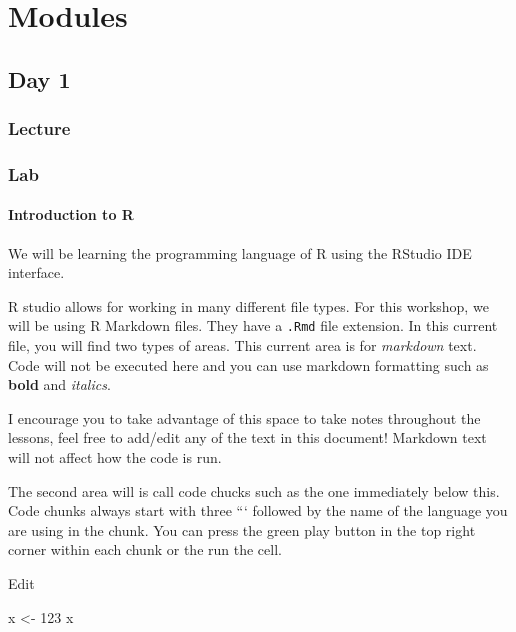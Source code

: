 \documentclass[
]{book}
\newenvironment{Shaded}{\begin{snugshade}}{\end{snugshade}}
\newcommand{\DecValTok}[1]{\textcolor[rgb]{0.00,0.00,0.81}{#1}}
\newcommand{\NormalTok}[1]{#1}
\newcommand{\OtherTok}[1]{\textcolor[rgb]{0.56,0.35,0.01}{#1}}
\begin{document}
\part{Modules}\label{part-modules}

\chapter{Day 1}\label{day-1}

\section{Lecture}\label{lecture}

\section{Lab}\label{lab}

\subsection{Introduction to R}\label{introduction-to-r}

We will be learning the programming language of R using the RStudio IDE interface.

R studio allows for working in many different file types. For this workshop, we will be using R Markdown files. They have a \texttt{.Rmd} file extension. In this current file, you will find two types of areas. This current area is for \emph{markdown} text. Code will not be executed here and you can use markdown formatting such as \textbf{bold} and \emph{italics}.

I encourage you to take advantage of this space to take notes throughout the lessons, feel free to add/edit any of the text in this document! Markdown text will not affect how the code is run.

The second area will is call code chucks such as the one immediately below this. Code chunks always start with three ``` followed by the name of the language you are using in the chunk. You can press the green play button in the top right corner within each chunk or the run the cell.

Edit

\begin{Shaded}
\begin{Highlighting}[]
\NormalTok{x }\OtherTok{\textless{}{-}} \DecValTok{123}
\NormalTok{x}
\end{Highlighting}
\end{Shaded}
\end{document}
